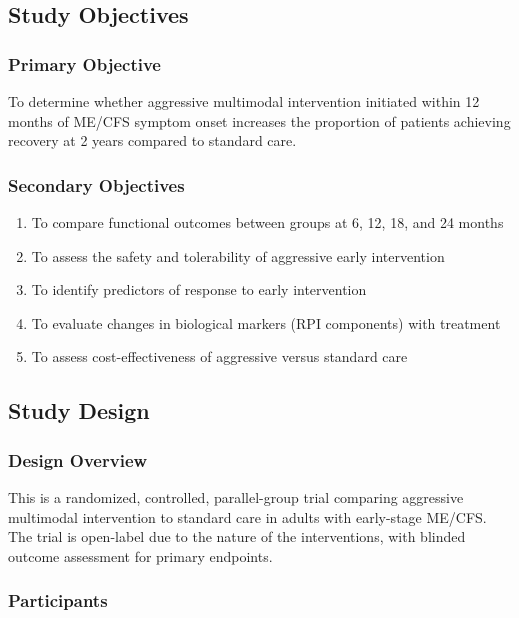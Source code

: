 \subsection{Study Objectives}

\subsubsection{Primary Objective}
To determine whether aggressive multimodal intervention initiated within 12 months of ME/CFS symptom onset increases the proportion of patients achieving recovery at 2 years compared to standard care.

\subsubsection{Secondary Objectives}
\begin{enumerate}
    \item To compare functional outcomes between groups at 6, 12, 18, and 24 months
    \item To assess the safety and tolerability of aggressive early intervention
    \item To identify predictors of response to early intervention
    \item To evaluate changes in biological markers (RPI components) with treatment
    \item To assess cost-effectiveness of aggressive versus standard care
\end{enumerate}

\subsection{Study Design}

\subsubsection{Design Overview}
This is a randomized, controlled, parallel-group trial comparing aggressive multimodal intervention to standard care in adults with early-stage ME/CFS. The trial is open-label due to the nature of the interventions, with blinded outcome assessment for primary endpoints.

\subsubsection{Participants}

